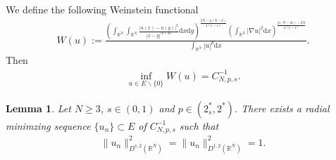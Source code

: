 \documentclass[12pt,a4paper,reqno]{amsart}
\numberwithin{equation}{section}
\newtheorem{lemma}{Lemma}[section]
\begin{document}
We define the following Weinstein functional
\begin{equation*}
\begin{aligned}
W(u):=
\frac{\left(
\int_{\mathbb{R}^{N}}
\int_{\mathbb{R}^{N}}
\frac{|u(x)-u(y)|^{2}}{|x-y|^{N+2s}}
\mathrm{d}x
\mathrm{d}y
\right)
^{\frac{2N-p(N-2)}{4(1-s)}}
\left(
\int_{\mathbb{R}^{N}}
|\nabla u|^{2}
\mathrm{d}x
\right)
^{\frac{p(N-2s)-2N}{4(1-s)}}}
{\int_{\mathbb{R}^{N}}
|u|^{p}
\mathrm{d}x}.
\end{aligned}
\end{equation*}
Then
\begin{equation*}
\begin{aligned}
\inf_{u\in E\backslash\{0\}}W(u)=C_{N,p,s}^{-1}.
\end{aligned}
\end{equation*}


\begin{lemma}\label{Lemma3.2}
Let $N\geqslant3$, $s\in(0,1)$ and $p\in (2^{*}_{s},2^{*})$.
There exists a radial minimzing sequence $\{u_{n}\}\subset E$ of $C_{N,p,s}^{-1}$ such that
\begin{equation*}
\begin{aligned}
\|u_{n}\|_{D^{s,2}(\mathbb{R}^{N})}^{2}
=
\|u_{n}\|_{D^{1,2}(\mathbb{R}^{N})}^{2}
=1.
\end{aligned}
\end{equation*}
\end{lemma}
\end{document}
